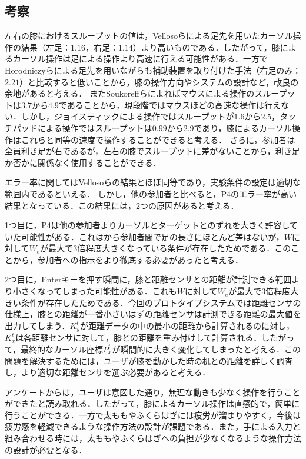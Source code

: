 \documentclass[submit, techrep]{ipsj}
\begin{document}
\subsection{考察}
左右の膝におけるスループットの値は，Vellosoら\cite{velloso:hal-01599657}による足先を用いたカーソル操作の結果（左足：$1.16$，右足：$1.14$）より高いものである．したがって，膝によるカーソル操作は足による操作より高速に行える可能性がある．一方でHorodniczyら\cite{Horodniczy:2017:FHE:3025453.3025625}による足先を用いながらも補助装置を取り付けた手法（右足のみ：$2.21$）と比較すると低いことから，膝の操作方向やシステムの設計など，改良の余地があると考える．
またSoukoreffらによれば\cite{Soukoreff:2004:TSP:1056153.1056155}マウスによる操作のスループットは$3.7$から$4.9$であることから，現段階ではマウスほどの高速な操作は行えない．しかし，ジョイスティックによる操作ではスループットが$1.6$から$2.5$，タッチパッドによる操作ではスループットは$0.99$から$2.9$であり，膝によるカーソル操作はこれらと同等の速度で操作することができると考える．
さらに，参加者は全員利き足が右であるが，左右の膝でスループットに差がないことから，利き足か否かに関係なく使用することができる．\par
エラー率に関してはVellosoら\cite{velloso:hal-01599657}の結果とほぼ同等であり，実験条件の設定は適切な範囲内であるといえる．
しかし，他の参加者と比べると，P4のエラー率が高い結果となっている．この結果には，2つの原因があると考える．\par
1つ目に，P4は他の参加者よりカーソルとターゲットとのずれを大きく許容していた可能性がある．これはから参加者間で足の長さにほとんど差はないが，$W$に対して$W_e$が最大で3倍程度大きくなっている条件が存在したためである．このことから，参加者への指示をより徹底する必要があったと考える．\par
2つ目に，Enterキーを押す瞬間に，膝と距離センサとの距離が計測できる範囲より小さくなってしまった可能性がある．これも$W$に対して$W_e$が最大で3倍程度大きい条件が存在したためである．今回のプロトタイプシステムでは距離センサの仕様上，膝との距離が一番小さいはずの距離センサは計測できる距離の最大値を出力してしまう．$K^t_y$が距離データの中の最小の距離から計算されるのに対し，$K^t_x$は各距離センサに対して，膝との距離を重み付けして計算される．したがって，最終的なカーソル座標$P^t_x$が瞬間的に大きく変化してしまったと考える．この問題を解決するためには，ユーザが膝を動かした時の机との距離を詳しく調査し，より適切な距離センサを選ぶ必要があると考える．\par
アンケートからは，ユーザは意図した通り，無理な動きも少なく操作を行うことができたと読み取れる．したがって，膝によるカーソル操作は直感的で，簡単に行うことができる．一方で太ももやふくらはぎには疲労が溜まりやすく，今後は疲労感を軽減できるような操作方法の設計が課題である．また，手による入力と組み合わせる時には，太ももやふくらはぎへの負担が少なくなるような操作方法の設計が必要となる．
\end{document}
